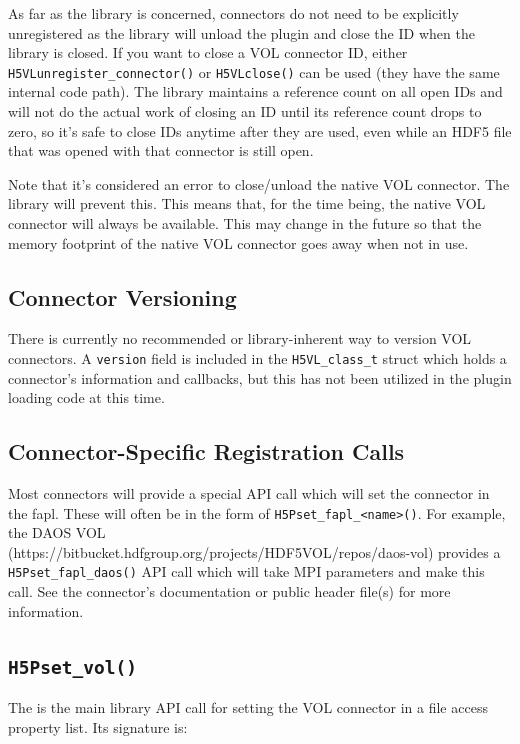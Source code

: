 As far as the library is concerned, connectors do not need to be explicitly unregistered as the library will unload the plugin and close the ID when the library is closed. If you want to close a VOL connector ID, either {\tt H5VLunregister\_connector()} or {\tt H5VLclose()} can be used (they have the same internal code path). The library maintains a reference count on all open IDs and will not do the actual work of closing an ID until its reference count drops to zero, so it's safe to close IDs anytime after they are used, even while an HDF5 file that was opened with that connector is still open.

Note that it's considered an error to close/unload the native VOL connector. The library will prevent this. This means that, for the time being, the native VOL connector will always be available. This may change in the future so that the memory footprint of the native VOL connector goes away when not in use.

\subsection{Connector Versioning}

\thgfuturewarning

There is currently no recommended or library-inherent way to version VOL connectors. A {\tt version} field is included in the {\tt H5VL\_class\_t} struct which holds a connector's information and callbacks, but this has not been utilized in the plugin loading code at this time.

\subsection{Connector-Specific Registration Calls}

Most connectors will provide a special API call which will set the connector in the fapl. These will often be in the form of {\tt H5Pset\_fapl\_<name>()}. For example, the DAOS VOL (https://bitbucket.hdfgroup.org/projects/HDF5VOL/repos/daos-vol) provides a {\tt H5Pset\_fapl\_daos()} API call which will take MPI parameters and make this call. See the connector's documentation or public header file(s) for more information.

\subsection{\tt H5Pset\_vol()}

The is the main library API call for setting the VOL connector in a file access property list. Its signature is:

